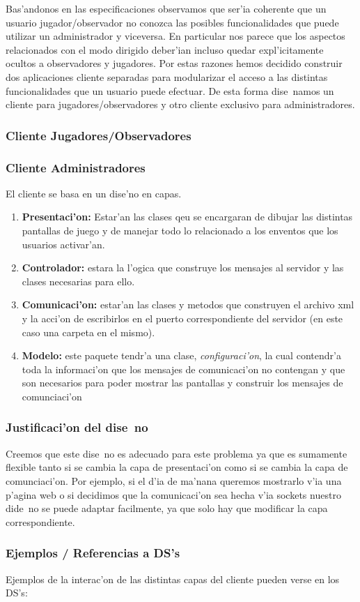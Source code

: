 Bas'andonos en las especificaciones observamos que ser'ia coherente que un usuario
 jugador/observador no conozca las posibles funcionalidades que puede utilizar un administrador y viceversa. En particular nos parece que los aspectos relacionados con el modo dirigido deber'ian incluso quedar expl'icitamente ocultos a observadores y jugadores. Por estas razones hemos decidido construir dos aplicaciones cliente separadas para modularizar el acceso a las distintas funcionalidades que un usuario puede efectuar. De esta forma dise~namos un cliente para jugadores/observadores y otro cliente exclusivo para administradores.

\subsubsection{Cliente Jugadores/Observadores}\label{Clientes::Jugadores/Observadores}

\subsubsection{Cliente Administradores}\label{Clientes::Administradores}

El cliente se basa en un dise'no en capas.


\begin{enumerate}
	\item \textbf{Presentaci'on: }Estar'an las clases qeu se encargaran de dibujar las distintas pantallas de juego y de manejar todo lo relacionado a los enventos que los usuarios activar'an.
	\item \textbf{Controlador: } estara la l'ogica que construye los mensajes al servidor y las clases necesarias para ello.
	\item \textbf{Comunicaci'on:} estar'an las clases y metodos que construyen el archivo xml y la acci'on de escribirlos en el puerto correspondiente del servidor (en este caso una carpeta en el mismo).
	\item  \textbf{Modelo:} este paquete tendr'a una clase, \textit{configuraci'on}, la cual contendr'a toda la informaci'on que los mensajes de comunicaci'on no contengan y que son necesarios para poder mostrar las pantallas y construir los mensajes de comunciaci'on
 \end{enumerate}

\subsubsection{Justificaci'on del dise~no}
Creemos que este dise~no es adecuado para este problema ya que es sumamente flexible tanto si se cambia la capa de presentaci'on como si se cambia la capa de comunciaci'on. Por ejemplo, si el d'ia de ma'nana queremos mostrarlo v'ia una p'agina web o si decidimos que la comunicaci'on sea hecha v'ia sockets nuestro dide~no se puede adaptar facilmente, ya que solo hay que modificar la capa correspondiente.

\subsubsection{Ejemplos / Referencias a DS's}
Ejemplos de la interac'on de las distintas capas del cliente pueden verse en los DS's:



